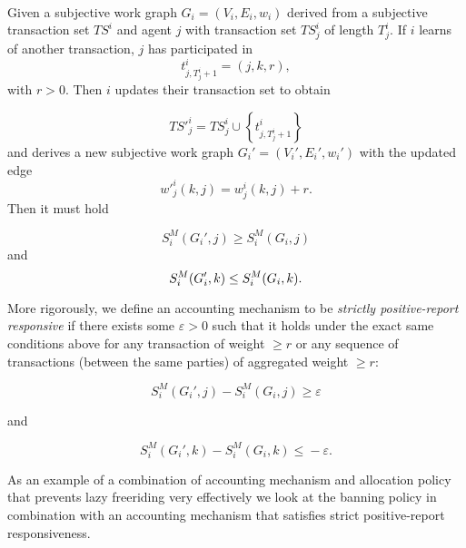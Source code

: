 \begin{definition}\ \\
\label{def:Positive-Report Responsiveness}
\noindent{}Given a subjective work graph $G_i=(V_i,E_i,w_i)$ derived from a subjective transaction set $TS^i$ and agent $j$ with transaction set $TS_j^i$ of length $T_j^i$. If $i$ learns of another transaction, $j$ has participated in \[t_{j,T_j^i+1}^i=(j,k,r),\] with $r>0$. Then $i$ updates their transaction set to obtain 

\[
TS'^i_j=TS^i_j\cup\left\lbrace{}t_{j,T^i_j+1}^i\right\rbrace
\]
and derives a new subjective work graph $G_i'=(V_i',E_i',w_i')$ with the updated edge
\[
w'^i_j(k,j)=w^i_j(k,j)+r.
\] 
\noindent{}Then it must hold

\[
S^M_i(G_i',j)\geq{}S^M_i(G_i,j)
\]
and
\[
S^M_i(G_i',k)\leq{}S^M_i(G_i,k). \vspace{1em}\\
\]

\noindent{}More rigorously, we define an accounting mechanism to be {\it strictly positive-report responsive} if there exists some $\varepsilon>0$ such that it holds under the exact same conditions above for any transaction of weight $\geq{}r$ or any sequence of transactions (between the same parties) of aggregated weight $\geq{}r$:

\[
S^M_i(G_i',j) - S^M_i(G_i,j)\geq{}\varepsilon
\]

\noindent{}and

\[
S^M_i(G_i',k) - S^M_i(G_i,k)\leq{}-\varepsilon .
\]
\end{definition}
\noindent{}As an example of a combination of accounting mechanism and allocation policy that prevents lazy freeriding very effectively we look at the banning policy in combination with an accounting mechanism that satisfies strict positive-report responsiveness.

